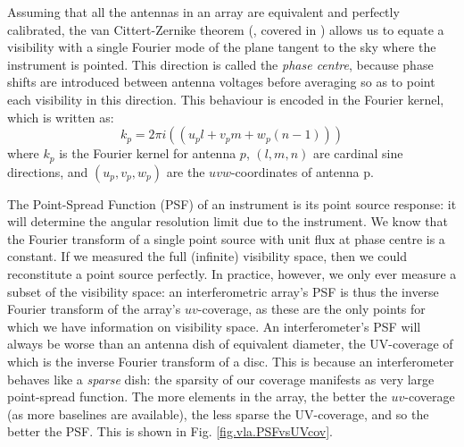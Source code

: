 \pg
Assuming that all the antennas in an array are equivalent and perfectly calibrated, the van Cittert-Zernike theorem (, covered in ) allows us to equate a visibility with a single Fourier mode of the plane tangent to the sky where the instrument is pointed. This direction is called the \emph{phase centre}, because phase shifts are introduced between antenna voltages before averaging so as to point each visibility in this direction. This behaviour is encoded in the Fourier kernel, which is written as:
\begin{equation}
k_p=2\pi i (( u_p l + v_p m + w_p (n-1) ))
\end{equation}
where $k_p$ is the Fourier kernel for antenna $p$, $(l,m,n)$ are cardinal sine directions, and $(u_p,v_p,w_p)$ are the $uvw$-coordinates of antenna p.


\pg
The Point-Spread Function (PSF) of an instrument is its point source response: it will determine the angular resolution limit due to the instrument. We know that the Fourier transform of a single point source with unit flux at phase centre is a constant. If we measured the full (infinite) visibility space, then we could reconstitute a point source perfectly. In practice, however, we only ever measure a subset of the visibility space: an interferometric array's PSF is thus the inverse Fourier transform of the array's $uv$-coverage, as these are the only points for which we have information on visibility space. An interferometer's PSF will always be worse than an antenna dish of equivalent diameter, the UV-coverage of which is the inverse Fourier transform of a disc. This is because an interferometer behaves like a \emph{sparse} dish: the sparsity of our coverage manifests as very large point-spread function. The more elements in the array, the better the $uv$-coverage (as more baselines are available), the less sparse the UV-coverage, and so the better the PSF. This is shown in Fig. \ref{fig.vla.PSFvsUVcov}.


